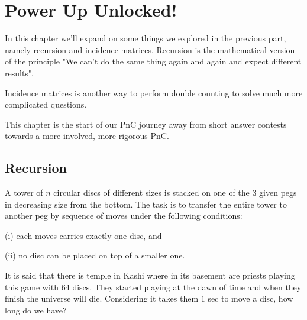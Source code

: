 \chapter{Power Up Unlocked!}
In this chapter we'll expand on some things we explored in the previous part, namely recursion and incidence 
matrices. Recursion is the mathematical version of the principle "We can't do the same thing again and 
again and expect different results". \par
Incidence matrices is another way to perform double counting to solve much more complicated questions.\par
This chapter is the start of our PnC journey away from short answer contests towards a more involved, 
more rigorous PnC.
\section{Recursion}
\begin{example}
A tower of $n$ circular discs of different sizes is stacked on one of the 3 given pegs in 
decreasing size from the bottom. The task is to transfer the entire tower to another peg by 
sequence of moves under the
following conditions:\par 
(i) each moves carries exactly one disc, and\par 
(ii) no disc can be placed on top of a smaller one.\par
It is said that there is temple in Kashi where in its basement are priests playing this game 
with $64$ discs. They started playing at the dawn of time and when they finish the universe will 
die. Considering it takes them $1$ sec to move a disc, how long do we have?
\end{example}
